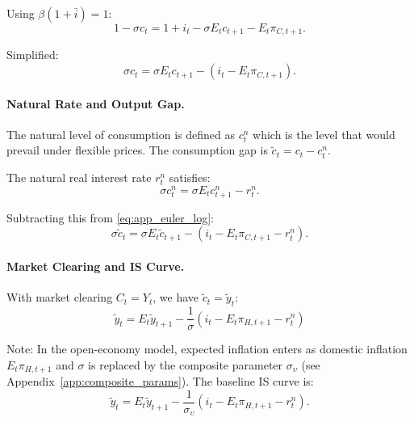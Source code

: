 \documentclass[12pt,a4paper]{article}
\begin{document}
\begin{appendices}
Using $\beta(1+\bar{i}) = 1$:
\begin{equation}
	1 - \sigma c_t = 1 + i_t - \sigma E_t c_{t+1} - E_t\pi_{C,t+1}.
\end{equation}

Simplified:
\begin{equation}
	\sigma c_t = \sigma E_t c_{t+1} - (i_t - E_t\pi_{C,t+1}).
	\label{eq:app_euler_log}
\end{equation}

\paragraph{Natural Rate and Output Gap.}
The natural level of consumption is defined as $c_t^n$ which is the level that would prevail under flexible prices. The consumption gap is $\tilde{c}_t = c_t - c_t^n$.

The natural real interest rate $r_t^n$ satisfies:
\begin{equation}
	\sigma c_t^n = \sigma E_t c_{t+1}^n - r_t^n.
\end{equation}

Subtracting this from \eqref{eq:app_euler_log}:
\begin{equation}
	\sigma \tilde{c}_t = \sigma E_t \tilde{c}_{t+1} - (i_t - E_t\pi_{C,t+1} - r_t^n).
\end{equation}

\paragraph{Market Clearing and IS Curve.}
With market clearing $C_t = Y_t$, we have $\tilde{c}_t = \tilde{y}_t$:
\begin{equation}
	\boxed{\tilde{y}_t = E_t\tilde{y}_{t+1} - \frac{1}{\sigma}(i_t - E_t\pi_{H,t+1} - r_t^n)}
	\label{eq:app_IS_baseline}
\end{equation}

Note: In the open-economy model, expected inflation enters as domestic inflation $E_t\pi_{H,t+1}$ and $\sigma$ is replaced by the composite parameter $\sigma_\upsilon$ (see Appendix~\ref{app:composite_params}). The baseline IS curve is:
\begin{equation}
	\tilde{y}_t = E_t\tilde{y}_{t+1} - \frac{1}{\sigma_\upsilon}(i_t - E_t\pi_{H,t+1} - r_t^n).
	\label{eq:app_IS_baseline_final}
\end{equation}


\end{appendices}
\end{document}
